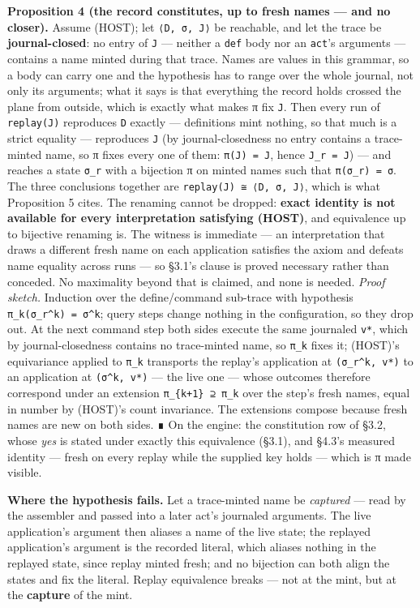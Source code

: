 \documentclass[
]{article}
\newcounter{none} %
\begin{document}
\textbf{Proposition 4 (the record constitutes, up to fresh names --- and
no closer).} Assume (HOST); let \texttt{⟨D,\ σ,\ J⟩} be reachable, and
let the trace be \textbf{journal-closed}: no entry of \texttt{J} ---
neither a \texttt{def} body nor an \texttt{act}'s arguments --- contains
a name minted during that trace. Names are values in this grammar, so a
body can carry one and the hypothesis has to range over the whole
journal, not only its arguments; what it says is that everything the
record holds crossed the plane from outside, which is exactly what makes
π fix \texttt{J}. Then every run of \texttt{replay(J)} reproduces
\texttt{D} exactly --- definitions mint nothing, so that much is a
strict equality --- reproduces \texttt{J} (by journal-closedness no
entry contains a trace-minted name, so π fixes every one of them:
\texttt{π(J)\ =\ J}, hence \texttt{J\_r\ =\ J}) --- and reaches a state
\texttt{σ\_r} with a bijection π on minted names such that
\texttt{π(σ\_r)\ =\ σ}. The three conclusions together are
\texttt{replay(J)\ ≅\ ⟨D,\ σ,\ J⟩}, which is what Proposition 5 cites.
The renaming cannot be dropped: \textbf{exact identity is not available
for every interpretation satisfying (HOST)}, and equivalence up to
bijective renaming is. The witness is immediate --- an interpretation
that draws a different fresh name on each application satisfies the
axiom and defeats name equality across runs --- so §3.1's clause is
proved necessary rather than conceded. No maximality beyond that is
claimed, and none is needed. \emph{Proof sketch.} Induction over the
define/command sub-trace with hypothesis
\texttt{π\_k(σ\_r\^{}k)\ =\ σ\^{}k}; query steps change nothing in the
configuration, so they drop out. At the next command step both sides
execute the same journaled \texttt{v*}, which by journal-closedness
contains no trace-minted name, so \texttt{π\_k} fixes it; (HOST)'s
equivariance applied to \texttt{π\_k} transports the replay's
application at \texttt{(σ\_r\^{}k,\ v*)} to an application at
\texttt{(σ\^{}k,\ v*)} --- the live one --- whose outcomes therefore
correspond under an extension \texttt{π\_\{k+1\}\ ⊇\ π\_k} over the
step's fresh names, equal in number by (HOST)'s count invariance. The
extensions compose because fresh names are new on both sides. ∎ On the
engine: the constitution row of §3.2, whose \emph{yes} is stated under
exactly this equivalence (§3.1), and §4.3's measured identity --- fresh
on every replay while the supplied key holds --- which is π made
visible.

\textbf{Where the hypothesis fails.} Let a trace-minted name be
\emph{captured} --- read by the assembler and passed into a later act's
journaled arguments. The live application's argument then aliases a name
of the live state; the replayed application's argument is the recorded
literal, which aliases nothing in the replayed state, since replay
minted fresh; and no bijection can both align the states and fix the
literal. Replay equivalence breaks --- not at the mint, but at the
\textbf{capture} of the mint.
\end{document}
